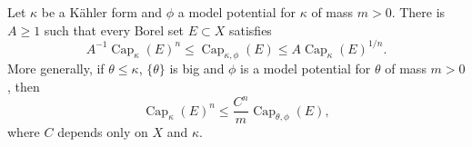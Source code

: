 \begin{proposition}\label{prop:kahler-model-capacity-powers}
Let $\kappa$ be a K\"ahler form and $\phi$ a model potential for $\kappa$ of mass $m>0$. There is $A\geq1$ such that every Borel set $E\subset X$ satisfies
\begin{equation}\label{eq:kahler-model-capacity-powers}
 A^{-1}\operatorname{Cap}_\kappa(E)^n
       \leq\operatorname{Cap}_{\kappa,\phi}(E)
       \leq A\operatorname{Cap}_\kappa(E)^{1/n}.
\end{equation}
More generally, if $\theta\leq\kappa$, $\{\theta\}$ is big and $\phi$ is a model potential for $\theta$ of mass $m>0$, then
\begin{equation}\label{eq:big-model-capacity-lower-power}
 \operatorname{Cap}_\kappa(E)^n
                        \leq\frac{C^n}{m}\operatorname{Cap}_{\theta,\phi}(E),
\end{equation}
where $C$ depends only on $X$ and $\kappa$.
\end{proposition}
